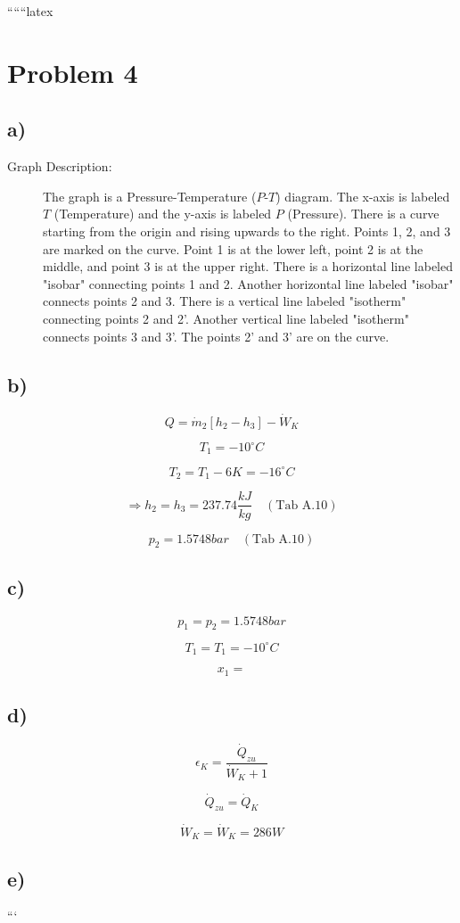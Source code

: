 
``````latex


\section*{Problem 4}

\subsection*{a)}

\begin{description}
    \item[Graph Description:] The graph is a Pressure-Temperature ($P$-$T$) diagram. The x-axis is labeled $T$ (Temperature) and the y-axis is labeled $P$ (Pressure). There is a curve starting from the origin and rising upwards to the right. Points 1, 2, and 3 are marked on the curve. Point 1 is at the lower left, point 2 is at the middle, and point 3 is at the upper right. There is a horizontal line labeled "isobar" connecting points 1 and 2. Another horizontal line labeled "isobar" connects points 2 and 3. There is a vertical line labeled "isotherm" connecting points 2 and 2'. Another vertical line labeled "isotherm" connects points 3 and 3'. The points 2' and 3' are on the curve.
\end{description}

\subsection*{b)}

\[
Q = \dot{m}_2 \left[ h_2 - h_3 \right] - \dot{W}_K
\]

\[
T_1 = -10^\circ C
\]

\[
T_2 = T_1 - 6K = -16^\circ C
\]

\[
\Rightarrow h_2 = h_3 = 237.74 \frac{kJ}{kg} \quad (\text{Tab A.10})
\]

\[
p_2 = 1.5748 bar \quad (\text{Tab A.10})
\]

\subsection*{c)}

\[
p_1 = p_2 = 1.5748 bar
\]

\[
T_1 = T_1 = -10^\circ C
\]

\[
x_1 =
\]

\subsection*{d)}

\[
\epsilon_K = \frac{\dot{Q}_{zu}}{\dot{W}_K + 1}
\]

\[
\dot{Q}_{zu} = \dot{Q}_K
\]

\[
\dot{W}_K = \dot{W}_K = 286W
\]

\subsection*{e)}

```